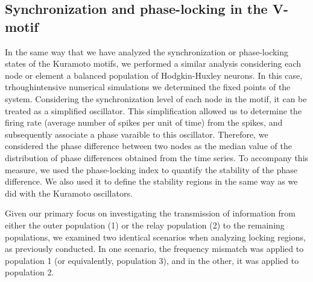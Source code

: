 \documentclass[../main.tex]{subfiles}
\begin{document}
\subsection{Synchronization and phase-locking in the V-motif}
In the same way that we have analyzed the synchronization or phase-locking states of the Kuramoto motifs, we performed a similar analysis considering each node or element a balanced population of Hodgkin-Huxley neurons.
In this case, trhoughintensive numerical simulations we determined the fixed points of the system.
Considering the synchronization level of each node in the motif,  it can be treated as a simplified oscillator. 
This simplification allowed us to determine the firing rate (average number of spikes per unit of time) from the spikes, and subsequently associate a phase varaible to this oscillator.
Therefore, we considered the phase difference between two nodes as the median value of the distribution of phase differences obtained from the time series.
To accompany this measure, we used the phase-locking index to quantify the stability of the phase difference.
We also used it to define the stability regions in the same way as we did with the Kuramoto oscillators.

Given our primary focus on investigating the transmission of information from either the outer population (1) or the relay population (2) to the remaining populations, we examined two identical scenarios when analyzing locking regions, as previously conducted.
In one scenario, the frequency mismatch was applied to population 1 (or equivalently, population 3), and in the other, it was applied to population 2.
\end{document}

